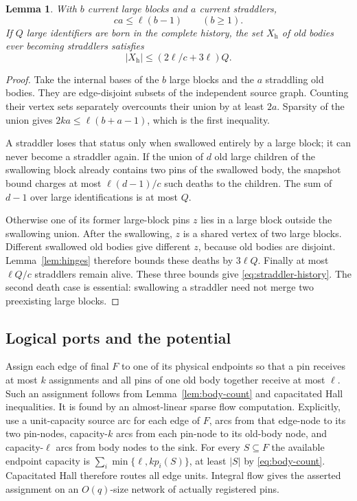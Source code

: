 \documentclass[11pt,a4paper]{article}
\newtheorem{lemma}[theorem]{Lemma}
\theoremstyle{definition}
\theoremstyle{remark}
\begin{document}
\begin{lemma}\label{lem:straddlers}
With $b$ current large blocks and $a$ current straddlers,
\[
 ca\leq\ell(b-1)\qquad(b\geq1).
\]
If $Q$ large identifiers are born in the complete history,
the set $X_{\mathrm h}$ of old bodies ever becoming
straddlers satisfies
\begin{equation}\label{eq:straddler-history}
 |X_{\mathrm h}|\leq(2\ell/c+3\ell)Q.
\end{equation}
\end{lemma}
\begin{proof}
Take the internal bases of the $b$ large blocks and the
$a$ straddling old bodies. They are edge-disjoint subsets
of the independent source graph. Counting their vertex
sets separately overcounts their union by at least $2a$.
Sparsity of the union gives
$2ka\leq\ell(b+a-1)$, which is the first inequality.

A straddler loses that status only when swallowed
entirely by a large block; it can never become a
straddler again. If the union of $d$ old large children
of the swallowing block already contains two pins of
the swallowed body, the snapshot bound charges at most
$\ell(d-1)/c$ such deaths to the children.
The sum of $d-1$ over large identifications is at most $Q$.

Otherwise one of its former large-block pins $z$ lies in
a large block outside the swallowing union. After the
swallowing, $z$ is a shared vertex of two large blocks.
Different swallowed old bodies give different $z$,
because old bodies are disjoint. Lemma~\ref{lem:hinges}
therefore bounds these deaths by $3\ell Q$.
Finally at most $\ell Q/c$ straddlers remain alive.
These three bounds give \eqref{eq:straddler-history}.
The second death case is essential: swallowing a
straddler need not merge two preexisting large blocks.
\end{proof}

\subsection{Logical ports and the potential}

Assign each edge of final $F$ to one of its physical
endpoints so that a pin receives at most $k$ assignments
and all pins of one old body together receive at most
$\ell$. Such an assignment follows from
Lemma~\ref{lem:body-count} and capacitated Hall inequalities.
It is found by an almost-linear sparse flow computation.
Explicitly, use a unit-capacity source arc for each edge of $F$,
arcs from that edge-node to its two pin-nodes, capacity-$k$ arcs
from each pin-node to its old-body node, and capacity-$\ell$ arcs
from body nodes to the sink. For every $S\subseteq F$ the
available endpoint capacity is
$\sum_i\min\{\ell,kp_i(S)\}$, at least $|S|$ by
\eqref{eq:body-count}. Capacitated Hall therefore routes all
edge units. Integral flow gives the asserted assignment on an
$O(q)$-size network of actually registered pins.
\end{document}
